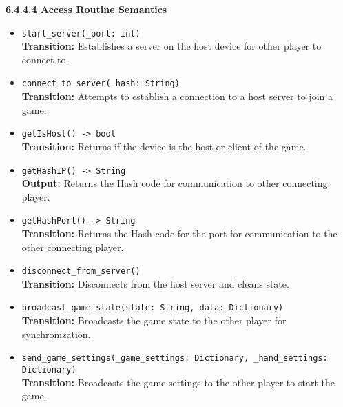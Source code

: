 \documentclass[12pt, titlepage]{article}
\begin{document}
\textbf{6.4.4.4 Access Routine Semantics}
\begin{itemize}
    \item \texttt{start\_server(\_port: int)}\\
    \textbf{Transition:} Establishes a server on the host device for other player to connect to.

    \item \texttt{connect\_to\_server(\_hash: String)}\\
    \textbf{Transition:} Attempts to establish a connection to a host server to join a game.

    \item \texttt{getIsHost() -> bool}\\
    \textbf{Transition:} Returns if the device is the host or client of the game.

    \item \texttt{getHashIP() -> String}\\
    \textbf{Output:} Returns the Hash code for communication to other connecting player.

    \item \texttt{getHashPort() -> String}\\
    \textbf{Transition:} Returns the Hash code for the port for communication to the other connecting player.
    
    \item \texttt{disconnect\_from\_server()}\\
    \textbf{Transition:} Disconnects from the host server and cleans state.
    
    \item \texttt{broadcast\_game\_state(state: String, data: Dictionary)}\\
    \textbf{Transition:} Broadcasts the game state to the other player for synchronization.
    
    \item \texttt{send\_game\_settings(\_game\_settings: Dictionary, \_hand\_settings: Dictionary)}\\
    \textbf{Transition:} Broadcasts the game settings to the other player to start the game.
\end{itemize}
\end{document}
